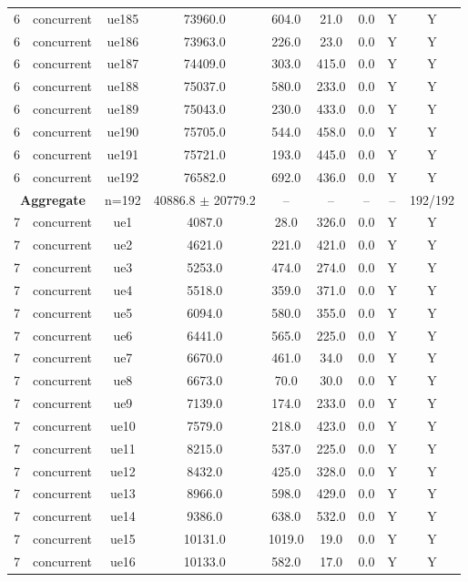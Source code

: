 \begin{table}[ht]
\begin{tabular}{|c|c|c|c|c|c|c|c|c|}
6 & concurrent & ue185 & 73960.0 & 604.0 & 21.0 & 0.0 & Y & Y \\
6 & concurrent & ue186 & 73963.0 & 226.0 & 23.0 & 0.0 & Y & Y \\
6 & concurrent & ue187 & 74409.0 & 303.0 & 415.0 & 0.0 & Y & Y \\
6 & concurrent & ue188 & 75037.0 & 580.0 & 233.0 & 0.0 & Y & Y \\
6 & concurrent & ue189 & 75043.0 & 230.0 & 433.0 & 0.0 & Y & Y \\
6 & concurrent & ue190 & 75705.0 & 544.0 & 458.0 & 0.0 & Y & Y \\
6 & concurrent & ue191 & 75721.0 & 193.0 & 445.0 & 0.0 & Y & Y \\
6 & concurrent & ue192 & 76582.0 & 692.0 & 436.0 & 0.0 & Y & Y \\
\multicolumn{2}{|c|}{\textbf{Aggregate}} & n=192 & 40886.8 $\pm$ 20779.2 & -- & -- & -- & -- & 192/192 \\
\hline
7 & concurrent & ue1 & 4087.0 & 28.0 & 326.0 & 0.0 & Y & Y \\
7 & concurrent & ue2 & 4621.0 & 221.0 & 421.0 & 0.0 & Y & Y \\
7 & concurrent & ue3 & 5253.0 & 474.0 & 274.0 & 0.0 & Y & Y \\
7 & concurrent & ue4 & 5518.0 & 359.0 & 371.0 & 0.0 & Y & Y \\
7 & concurrent & ue5 & 6094.0 & 580.0 & 355.0 & 0.0 & Y & Y \\
7 & concurrent & ue6 & 6441.0 & 565.0 & 225.0 & 0.0 & Y & Y \\
7 & concurrent & ue7 & 6670.0 & 461.0 & 34.0 & 0.0 & Y & Y \\
7 & concurrent & ue8 & 6673.0 & 70.0 & 30.0 & 0.0 & Y & Y \\
7 & concurrent & ue9 & 7139.0 & 174.0 & 233.0 & 0.0 & Y & Y \\
7 & concurrent & ue10 & 7579.0 & 218.0 & 423.0 & 0.0 & Y & Y \\
7 & concurrent & ue11 & 8215.0 & 537.0 & 225.0 & 0.0 & Y & Y \\
7 & concurrent & ue12 & 8432.0 & 425.0 & 328.0 & 0.0 & Y & Y \\
7 & concurrent & ue13 & 8966.0 & 598.0 & 429.0 & 0.0 & Y & Y \\
7 & concurrent & ue14 & 9386.0 & 638.0 & 532.0 & 0.0 & Y & Y \\
7 & concurrent & ue15 & 10131.0 & 1019.0 & 19.0 & 0.0 & Y & Y \\
7 & concurrent & ue16 & 10133.0 & 582.0 & 17.0 & 0.0 & Y & Y \\

\end{tabular}
\end{table}
